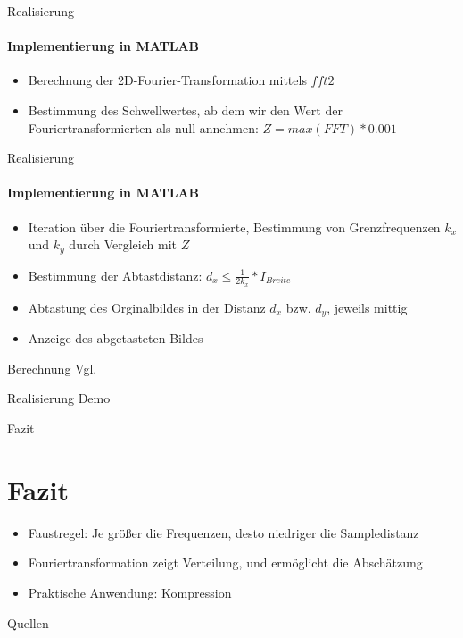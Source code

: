 \documentclass{beamer}
\begin{document}
	\begin{frame}{Realisierung}
	\framesubtitle{Implementierung in MATLAB}
	\begin{itemize}
		\item Berechnung der 2D-Fourier-Transformation mittels $fft2$
		\item Bestimmung des \dq Schwellwertes\dq, ab dem wir den Wert der Fouriertransformierten als null annehmen: $Z = max(FFT)*0.001$	
	\end{itemize}

	\end{frame}

	\begin{frame}{Realisierung}
	\framesubtitle{Implementierung in MATLAB}
	\begin{itemize}
	\item Iteration über die Fouriertransformierte, Bestimmung von Grenzfrequenzen $k_x$ und $k_y$ durch Vergleich mit $Z$
	\item Bestimmung der Abtastdistanz: $d_x\leq \frac{1}{2k_x}*I_{Breite}$
	\item Abtastung des Orginalbildes in der Distanz $d_x$ bzw. $d_y$, jeweils mittig
	\item Anzeige des abgetasteten Bildes
	\end{itemize}
	Berechnung Vgl. \cite{dip}
	\end{frame}
	\begin{frame}{Realisierung}
	Demo
	\end{frame}
	\begin{frame}{Fazit}
	\section{Fazit}
	\begin{itemize}
		\item Faustregel: Je größer die Frequenzen, desto niedriger die Sampledistanz
		\item Fouriertransformation zeigt Verteilung, und ermöglicht die Abschätzung
		\item Praktische Anwendung: Kompression
	\end{itemize}
	\end{frame}
	
	\begin{frame}{Quellen}
		\begin{multicols}{2}
		\tiny{
			
			
		}
		\end{multicols}
	\end{frame}
	
\end{document}
